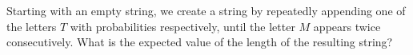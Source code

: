 Starting with an empty string, we create a string by repeatedly appending one of the letters   $T$ with probabilities    respectively, until the letter $M$ appears twice consecutively. What is the expected value of the length of the resulting string?